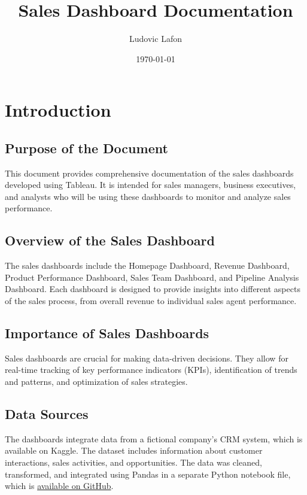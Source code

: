 \documentclass{article}
\title{Sales Dashboard Documentation}
\author{Ludovic Lafon}
\date{\today}
\begin{document}
\maketitle
\tableofcontents
\newpage %

\section{Introduction}

\subsection{Purpose of the Document}
This document provides comprehensive documentation of the sales dashboards developed using Tableau. It is intended for sales managers, business executives, and analysts who will be using these dashboards to monitor and analyze sales performance.

\subsection{Overview of the Sales Dashboard}
The sales dashboards include the Homepage Dashboard, Revenue Dashboard, Product Performance Dashboard, Sales Team Dashboard, and Pipeline Analysis Dashboard. Each dashboard is designed to provide insights into different aspects of the sales process, from overall revenue to individual sales agent performance.

\subsection{Importance of Sales Dashboards}
Sales dashboards are crucial for making data-driven decisions. They allow for real-time tracking of key performance indicators (KPIs), identification of trends and patterns, and optimization of sales strategies.

\subsection{Data Sources}
The dashboards integrate data from a fictional company's CRM system, which is available on Kaggle. The dataset includes information about customer interactions, sales activities, and opportunities. The data was cleaned, transformed, and integrated using Pandas in a separate Python notebook file, which is  \href{[https://github.com/LAlto96/sales-analytics-dashboard]}{available on GitHub}.
\end{document}

